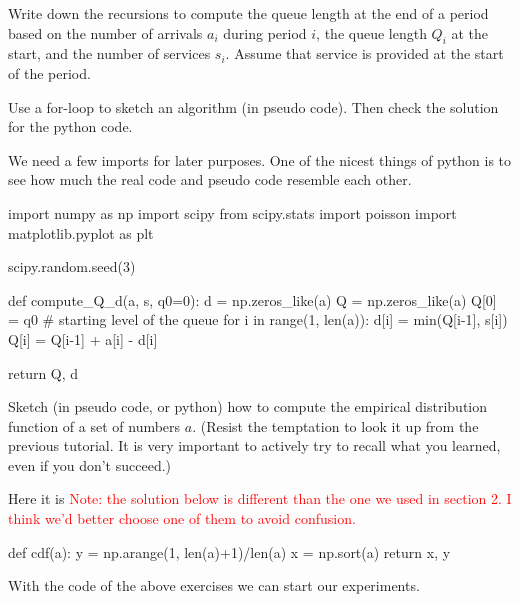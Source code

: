 \documentclass{scrartcl}
\newcommand{\notet}[1]{\textcolor{red}{#1}}
\begin{document}
\begin{exercise}
Write down the recursions to compute the queue length at the end of a period based on the number of arrivals $a_i$ during  period $i$, the queue length $Q_i$ at the start, and the number of services $s_i$. Assume that service is provided at the start of the period.  

Use a for-loop to sketch an algorithm (in pseudo code). Then check the solution for the python code.

  \begin{solution}
We need a few imports for later purposes.   One of the nicest things of python is to see how much the real code and pseudo code resemble each other.

\begin{pyblock}
import numpy as np
import scipy
from scipy.stats import poisson
import matplotlib.pyplot as plt

scipy.random.seed(3) 


def compute_Q_d(a, s, q0=0):
    d = np.zeros_like(a)
    Q = np.zeros_like(a)
    Q[0] = q0 # starting level of the queue
    for i in range(1, len(a)):
        d[i] = min(Q[i-1], s[i])
        Q[i] = Q[i-1] + a[i] - d[i]

    return Q, d
  
\end{pyblock}

  \end{solution}
  
\end{exercise}

\begin{exercise}
  Sketch (in pseudo code, or python) how to compute the empirical distribution function of a set of numbers $a$. (Resist the temptation to look it up from the previous tutorial. It is very important to actively try to recall what you learned, even if you don't succeed.)
  \begin{solution}
Here it is \notet{Note: the solution below is different than the one we used in section 2. I think we'd better choose one of them to avoid confusion.}
\begin{pyblock}
def cdf(a):
    y = np.arange(1, len(a)+1)/len(a)
    x = np.sort(a)
    return x, y
  
\end{pyblock}
  \end{solution}
\end{exercise}

With the code of the above exercises we can start our experiments.
\end{document}
